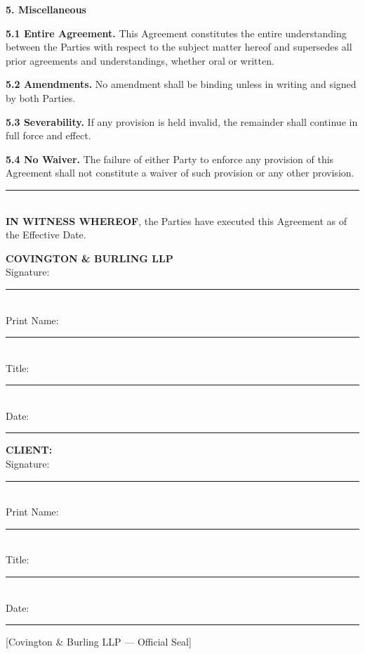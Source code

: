 \documentclass[11pt,letterpaper]{article}
\begin{document}
\vspace{0.3cm}
\noindent \textcolor{DarkNavy}{\large \textbf{5. Miscellaneous}}

\noindent \textbf{5.1 Entire Agreement.} This Agreement constitutes the entire
understanding between the Parties with respect to the subject matter hereof and
supersedes all prior agreements and understandings, whether oral or written.

\noindent \textbf{5.2 Amendments.} No amendment shall be binding unless in
writing and signed by both Parties.

\noindent \textbf{5.3 Severability.} If any provision is held invalid, the
remainder shall continue in full force and effect.

\noindent \textbf{5.4 No Waiver.} The failure of either Party to enforce any
provision of this Agreement shall not constitute a waiver of such provision or
any other provision.

\vfill
\begin{center}
  \textcolor{MutedGold}{\rule{0.4\textwidth}{0.5pt}} \\[4pt]
  \textcolor{DarkNavy}{\textbf{IN WITNESS WHEREOF}}, the Parties have executed
  this Agreement as of the Effective Date.
\end{center}

\vspace{0.5cm}
\begin{minipage}[t]{0.45\textwidth}
  \textcolor{DarkNavy}{\textbf{COVINGTON \& BURLING LLP}} \\[0.3cm]
  \textcolor{DarkNavy!60!black}{\small Signature:} \rule{5cm}{0.4pt} \\[0.2cm]
  \textcolor{DarkNavy!60!black}{\small Print Name:} \rule{5cm}{0.4pt} \\[0.2cm]
  \textcolor{DarkNavy!60!black}{\small Title:} \rule{5cm}{0.4pt} \\[0.2cm]
  \textcolor{DarkNavy!60!black}{\small Date:} \rule{4cm}{0.4pt}
\end{minipage}
\hfill
\begin{minipage}[t]{0.45\textwidth}
  \textcolor{DarkNavy}{\textbf{CLIENT: \ClientName}} \\[0.3cm]
  \textcolor{DarkNavy!60!black}{\small Signature:} \rule{5cm}{0.4pt} \\[0.2cm]
  \textcolor{DarkNavy!60!black}{\small Print Name:} \rule{5cm}{0.4pt} \\[0.2cm]
  \textcolor{DarkNavy!60!black}{\small Title:} \rule{5cm}{0.4pt} \\[0.2cm]
  \textcolor{DarkNavy!60!black}{\small Date:} \rule{4cm}{0.4pt}
\end{minipage}

\vspace{0.3cm}
\begin{center}
  \textcolor{DarkNavy!30!white}{\small [Covington \& Burling LLP — Official Seal]}
\end{center}
\end{document}
